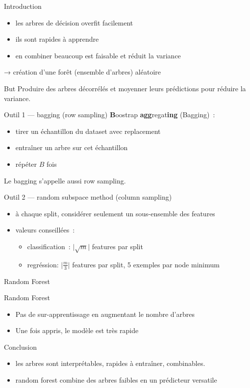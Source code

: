 \begin{frame}{Introduction}
  \begin{itemize}
  \item les arbres de décision overfit facilement
  \item ils sont rapides à apprendre
  \item en combiner beaucoup est faisable et réduit la variance
  \end{itemize}
  → création d'une forêt (ensemble d'arbres) aléatoire
\end{frame}

\begin{frame}{But}
  Produire des arbres décorrélés et moyenner leurs prédictions pour
  réduire la variance.
\end{frame}

\begin{frame}{Outil 1 — bagging (row sampling)}
  \textbf{B}oostrap \textbf{agg}regat\textbf{ing} (Bagging) :
  \begin{itemize}
  \item tirer un échantillon du dataset avec replacement
  \item entraîner un arbre sur cet échantillon
  \item répéter $B$ fois
  \end{itemize}
  Le bagging s'appelle aussi row sampling.
\end{frame}

\begin{frame}{Outil 2 — random subspace method (column sampling)}
  \begin{itemize}
  \item à chaque split, considérer seulement un sous-ensemble des
    features
  \item valeurs conseillées :
    \begin{itemize}
    \item classification : $\lvert\sqrt m\rvert$ features par split
    \item regréssion: $\lvert\frac{m}{3}\rvert$ features par split, 5
      exemples par node minimum
    \end{itemize}
  \end{itemize}
\end{frame}

\begin{frame}{Random Forest}
\end{frame}

\begin{frame}{Random Forest}
  \begin{itemize}
  \item Pas de sur-apprentissage en augmentant le nombre d'arbres
  \item Une fois appris, le modèle est très rapide
  \end{itemize}
\end{frame}

\begin{frame}{Conclusion}
  \begin{itemize}
  \item les arbres sont interprétables, rapides à entraîner,
    combinables.
  \item random forest combine des arbres faibles en un prédicteur
    versatile
  \end{itemize}
\end{frame}
